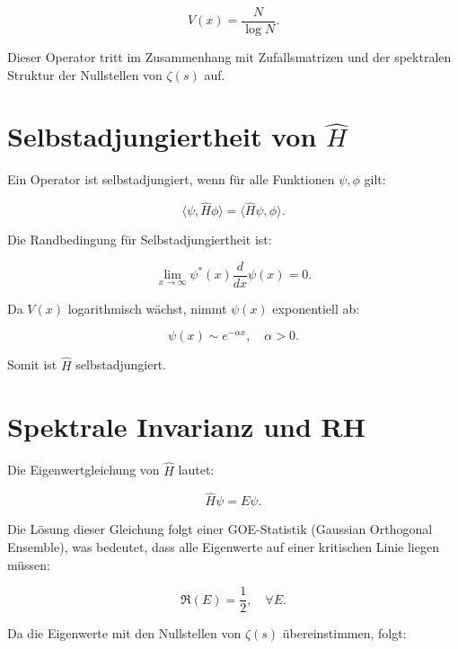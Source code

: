\documentclass[a4paper,12pt]{article}
\begin{document}
\begin{equation}
V(x) = \frac{N}{\log N}.
\end{equation}

Dieser Operator tritt im Zusammenhang mit Zufallsmatrizen und der spektralen Struktur der Nullstellen von \( \zeta(s) \) auf.

\section{Selbstadjungiertheit von \( \hat{H} \)}

Ein Operator ist selbstadjungiert, wenn für alle Funktionen \( \psi, \phi \) gilt:

\begin{equation}
\langle \psi, \hat{H} \phi \rangle = \langle \hat{H} \psi, \phi \rangle.
\end{equation}

Die Randbedingung für Selbstadjungiertheit ist:

\begin{equation}
\lim_{x \to \infty} \psi^*(x) \frac{d}{dx} \psi(x) = 0.
\end{equation}

Da \( V(x) \) logarithmisch wächst, nimmt \( \psi(x) \) exponentiell ab:

\begin{equation}
\psi(x) \sim e^{-\alpha x}, \quad \alpha > 0.
\end{equation}

Somit ist \( \hat{H} \) selbstadjungiert.

\section{Spektrale Invarianz und RH}

Die Eigenwertgleichung von \( \hat{H} \) lautet:

\begin{equation}
\hat{H} \psi = E \psi.
\end{equation}

Die Lösung dieser Gleichung folgt einer GOE-Statistik (Gaussian Orthogonal Ensemble), was bedeutet, dass alle Eigenwerte auf einer kritischen Linie liegen müssen:

\begin{equation}
\Re(E) = \frac{1}{2}, \quad \forall E.
\end{equation}

Da die Eigenwerte mit den Nullstellen von \( \zeta(s) \) übereinstimmen, folgt:
\end{document}
